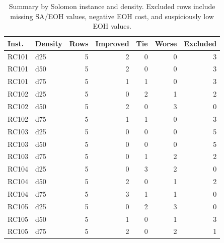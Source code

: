 \begin{table}[t]
\centering
\caption{Summary by Solomon instance and density. Excluded rows include missing SA/EOH values, negative EOH cost, and suspiciously low EOH values.}
\label{tab:summary-density}
\small
\begin{tabular}{llrrrrr}
\toprule
Inst. & Density & Rows & Improved & Tie & Worse & Excluded \\
\midrule
RC101 & d25 & 5 & 2 & 0 & 0 & 3 \\
RC101 & d50 & 5 & 2 & 0 & 0 & 3 \\
RC101 & d75 & 5 & 1 & 1 & 0 & 3 \\
RC102 & d25 & 5 & 0 & 2 & 1 & 2 \\
RC102 & d50 & 5 & 2 & 0 & 3 & 0 \\
RC102 & d75 & 5 & 1 & 1 & 0 & 3 \\
RC103 & d25 & 5 & 0 & 0 & 0 & 5 \\
RC103 & d50 & 5 & 0 & 0 & 0 & 5 \\
RC103 & d75 & 5 & 0 & 1 & 2 & 2 \\
RC104 & d25 & 5 & 0 & 3 & 2 & 0 \\
RC104 & d50 & 5 & 2 & 0 & 1 & 2 \\
RC104 & d75 & 5 & 3 & 1 & 1 & 0 \\
RC105 & d25 & 5 & 0 & 2 & 3 & 0 \\
RC105 & d50 & 5 & 1 & 0 & 1 & 3 \\
RC105 & d75 & 5 & 2 & 0 & 2 & 1 \\
\bottomrule
\end{tabular}
\end{table}
